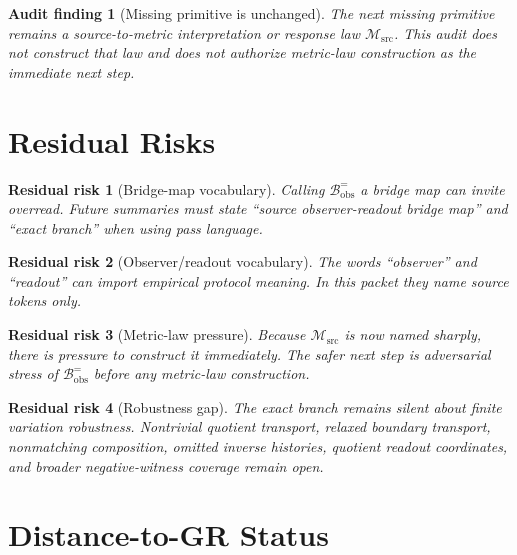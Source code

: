 \documentclass[11pt]{article}
\newcommand{\Bobs}{\mathcal{B}^{=}_{\mathrm{obs}}}
\newcommand{\Msrc}{\mathcal{M}_{\mathrm{src}}}
\newtheorem{auditfinding}{Audit finding}
\newtheorem{residualrisk}{Residual risk}
\begin{document}
\begin{auditfinding}[Missing primitive is unchanged]
The next missing primitive remains a source-to-metric interpretation
or response law \(\Msrc\). This audit does not construct that law and
does not authorize metric-law construction as the immediate next
step.
\end{auditfinding}

\section{Residual Risks}

\begin{residualrisk}[Bridge-map vocabulary]
Calling \(\Bobs\) a bridge map can invite overread. Future summaries
must state ``source observer-readout bridge map'' and ``exact branch''
when using pass language.
\end{residualrisk}

\begin{residualrisk}[Observer/readout vocabulary]
The words ``observer'' and ``readout'' can import empirical protocol
meaning. In this packet they name source tokens only.
\end{residualrisk}

\begin{residualrisk}[Metric-law pressure]
Because \(\Msrc\) is now named sharply, there is pressure to construct
it immediately. The safer next step is adversarial stress of \(\Bobs\)
before any metric-law construction.
\end{residualrisk}

\begin{residualrisk}[Robustness gap]
The exact branch remains silent about finite variation robustness.
Nontrivial quotient transport, relaxed boundary transport,
nonmatching composition, omitted inverse histories, quotient readout
coordinates, and broader negative-witness coverage remain open.
\end{residualrisk}

\section{Distance-to-GR Status}
\end{document}
